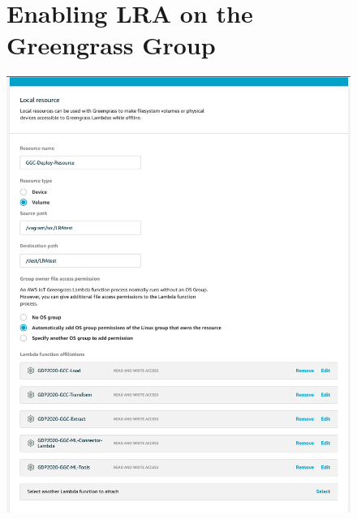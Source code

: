 \begin{figure}
\begin{minipage}{\linewidth}
\section{Enabling LRA on the Greengrass Group}
    \centering
    \includegraphics[width=1\linewidth]{pages/Chapter4/Chapter 4 Images/greengrass_LRA.png}
    \label{appendix:ggc_lra}
\end{minipage}
\end{figure}
    
